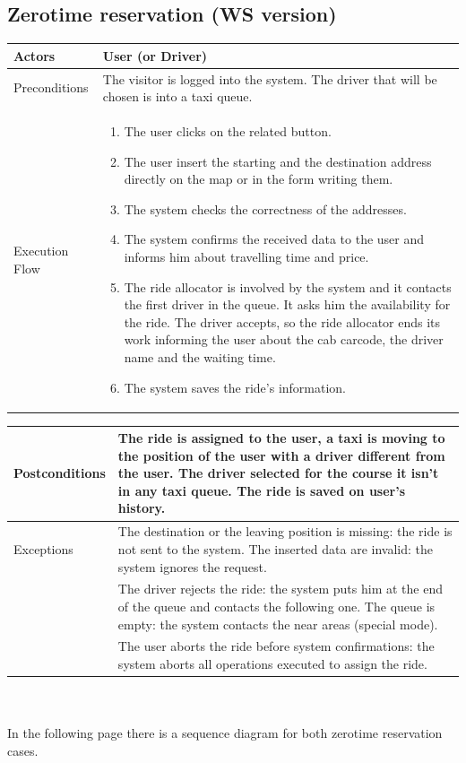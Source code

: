 \subsection{Zerotime reservation (WS version)}
\begin{tabular}{lp{8cm}}
	\hline 
	Actors & User (or Driver)  \\ \hline
	Preconditions & The visitor is logged into the system. The driver that will be chosen is into a taxi queue.  \\ \hline
	Execution Flow &  \begin{enumerate}
					\item The user clicks on the related button.
					\item The user insert the starting and the destination address directly on the map or in the form writing them.
					\item The system checks the correctness of the addresses.
					\item The system confirms the received data to the user and informs him about travelling time and price.
					\item The ride allocator is involved by the system and it contacts the first driver in the queue. It asks him the availability for the ride. The driver accepts, so the ride allocator ends its work informing the user about the cab carcode, the driver name and the waiting time.
					\item The system saves the ride's information.
				\end{enumerate}
\\ \hline
\end{tabular}
\newpage
\begin{tabular}{lp{8cm}}
	\hline	 
	 Postconditions & The ride is assigned to the user, a taxi is moving to the position of the user with a driver different from the user. The driver selected for the course it isn't in any taxi queue. The ride is saved on user's history. \\ \hline
	 Exceptions &  The destination or the leaving position is missing: the ride is not sent to the system. The inserted data are invalid: the system ignores the request.\\
& The driver rejects the ride: the system puts him at the end of the queue and contacts the following one. The queue is empty: the system contacts the near areas (special mode).\\
& The user aborts the ride before system confirmations: the system aborts all operations executed to assign the ride.
\\ \hline
\end{tabular}
\\
\\
In the following page there is a sequence diagram for both zerotime reservation cases.\\

